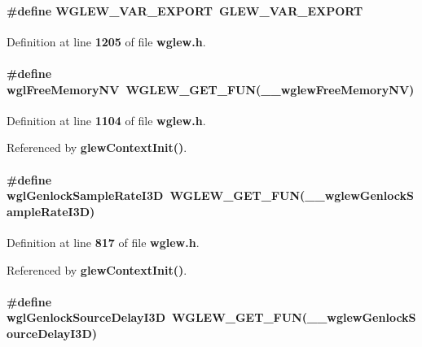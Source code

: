 \paragraph[{W\+G\+L\+E\+W\+\_\+\+V\+A\+R\+\_\+\+E\+X\+P\+O\+RT}]{\setlength{\rightskip}{0pt plus 5cm}\#define W\+G\+L\+E\+W\+\_\+\+V\+A\+R\+\_\+\+E\+X\+P\+O\+RT~{\bf G\+L\+E\+W\+\_\+\+V\+A\+R\+\_\+\+E\+X\+P\+O\+RT}}\label{wglew_8h_a8c6eaf86fc238babaca4ac8c93c8c3b7}


Definition at line {\bf 1205} of file {\bf wglew.\+h}.

\paragraph[{wgl\+Free\+Memory\+NV}]{\setlength{\rightskip}{0pt plus 5cm}\#define wgl\+Free\+Memory\+NV~{\bf W\+G\+L\+E\+W\+\_\+\+G\+E\+T\+\_\+\+F\+UN}({\bf \+\_\+\+\_\+wglew\+Free\+Memory\+NV})}\label{wglew_8h_af7be2b2eca44d8dbb20f383f1ab3074e}


Definition at line {\bf 1104} of file {\bf wglew.\+h}.



Referenced by {\bf glew\+Context\+Init()}.

\paragraph[{wgl\+Genlock\+Sample\+Rate\+I3D}]{\setlength{\rightskip}{0pt plus 5cm}\#define wgl\+Genlock\+Sample\+Rate\+I3D~{\bf W\+G\+L\+E\+W\+\_\+\+G\+E\+T\+\_\+\+F\+UN}({\bf \+\_\+\+\_\+wglew\+Genlock\+Sample\+Rate\+I3D})}\label{wglew_8h_a971c6a430d88acc62cdb08e8cb9203d3}


Definition at line {\bf 817} of file {\bf wglew.\+h}.



Referenced by {\bf glew\+Context\+Init()}.

\paragraph[{wgl\+Genlock\+Source\+Delay\+I3D}]{\setlength{\rightskip}{0pt plus 5cm}\#define wgl\+Genlock\+Source\+Delay\+I3D~{\bf W\+G\+L\+E\+W\+\_\+\+G\+E\+T\+\_\+\+F\+UN}({\bf \+\_\+\+\_\+wglew\+Genlock\+Source\+Delay\+I3D})}\label{wglew_8h_a4c3f965a7052f4dc214eaf276d3cbcea}


